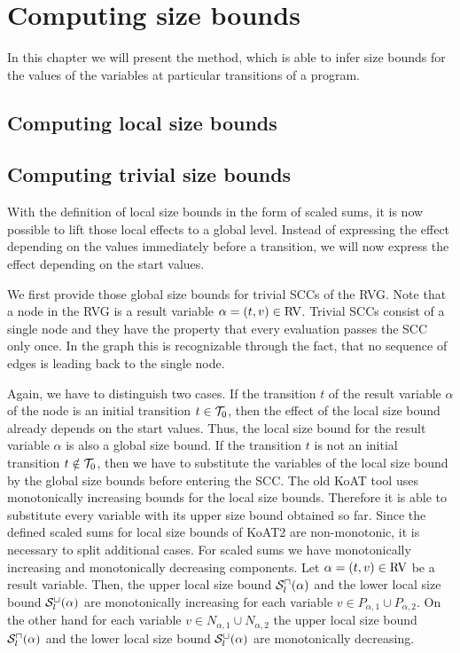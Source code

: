 \section{Computing size bounds}

In this chapter we will present the method, which is able to infer size bounds for the values of the variables at particular transitions of a program.


\subsection{Computing local size bounds}




\subsection{Computing trivial size bounds}

With the definition of local size bounds in the form of scaled sums, it is now possible to lift those local effects to a global level.
Instead of expressing the effect depending on the values immediately before a transition, we will now express the effect depending on the start values.

We first provide those global size bounds for trivial SCCs of the RVG.
Note that a node in the RVG is a result variable $\alpha = (t,v) \in \text{RV}$.
Trivial SCCs consist of a single node and they have the property that every evaluation passes the SCC only once.
In the graph this is recognizable through the fact, that no sequence of edges is leading back to the single node.

Again, we have to distinguish two cases.
If the transition $t$ of the result variable $\alpha$ of the node is an initial transition $t \in \mathcal{T}_0$, then the effect of the local size bound already depends on the start values.
Thus, the local size bound for the result variable $\alpha$ is also a global size bound.
If the transition $t$ is not an initial transition $t \notin \mathcal{T}_0$, then we have to substitute the variables of the local size bound by the global size bounds before entering the SCC.
The old KoAT tool uses monotonically increasing bounds for the local size bounds.
Therefore it is able to substitute every variable with its upper size bound obtained so far.
Since the defined scaled sums for local size bounds of KoAT2 are non-monotonic, it is necessary to split additional cases.
For scaled sums we have monotonically increasing and monotonically decreasing components.
Let $\alpha = (t,v) \in \text{RV}$ be a result variable.
Then, the upper local size bound ${\mathcal{S}^\sqcap_l}(\alpha)$ and the lower local size bound ${\mathcal{S}^\sqcup_l}(\alpha)$ are monotonically increasing for each variable $v \in P_{\alpha,1} \cup P_{\alpha,2}$.
On the other hand for each variable $v \in N_{\alpha,1} \cup N_{\alpha,2}$ the upper local size bound ${\mathcal{S}^\sqcap_l}(\alpha)$ and the lower local size bound ${\mathcal{S}^\sqcup_l}(\alpha)$ are monotonically decreasing.

